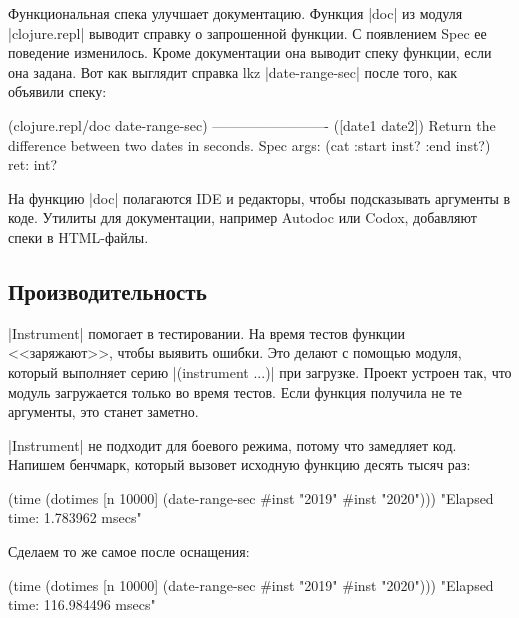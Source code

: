 Функциональная спека улучшает документацию. Функция \spverb|doc| из модуля
\spverb|clojure.repl| выводит справку о запрошенной функции. С появлением Spec
ее поведение изменилось. Кроме документации она выводит спеку функции, если она
задана. Вот как выглядит справка lkz \spverb|date-range-sec| после того, как
объявили спеку:

\begin{english}
  \begin{clojure}
(clojure.repl/doc date-range-sec)
-------------------------
([date1 date2])
  Return the difference between two dates in seconds.
Spec
  args: (cat :start inst? :end inst?)
  ret: int?
  \end{clojure}
\end{english}

На функцию \spverb|doc| полагаются IDE и редакторы, чтобы подсказывать аргументы
в коде. Утилиты для документации, например
Autodoc или
Codox, добавляют спеки в
HTML-файлы.

\subsection{Производительность}

\spverb|Instrument| помогает в тестировании. На время тестов функции
<<заряжают>>, чтобы выявить ошибки. Это делают с помощью модуля, который
выполняет серию \spverb|(instrument ...)| при загрузке. Проект устроен так, что
модуль загружается только во время тестов. Если функция получила не те
аргументы, это станет заметно.

\spverb|Instrument| не подходит для боевого режима, потому что замедляет
код. Напишем бенчмарк, который вызовет исходную функцию десять тысяч раз:

\begin{english}
  \begin{clojure}
(time
 (dotimes [n 10000]
   (date-range-sec #inst "2019" #inst "2020")))
"Elapsed time: 1.783962 msecs"
  \end{clojure}
\end{english}

Сделаем то же самое после оснащения:

\begin{english}
  \begin{clojure}
(time
 (dotimes [n 10000]
   (date-range-sec #inst "2019" #inst "2020")))
"Elapsed time: 116.984496 msecs"
  \end{clojure}
\end{english}

